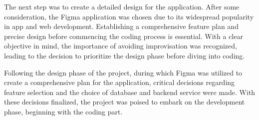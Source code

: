 \par
The next step was to create a detailed design for the application. After some consideration, the Figma application was chosen due to its widespread popularity in app and web development. Establishing a comprehensive feature plan and precise design before commencing the coding process is essential. With a clear objective in mind, the importance of avoiding improvisation was recognized, leading to the decision to prioritize the design phase before diving into coding.
\par
Following the design phase of the project, during which Figma was utilized to create a comprehensive plan for the application, critical decisions regarding feature selection and the choice of database and backend service were made. With these decisions finalized, the project was poised to embark on the development phase, beginning with the coding part.
